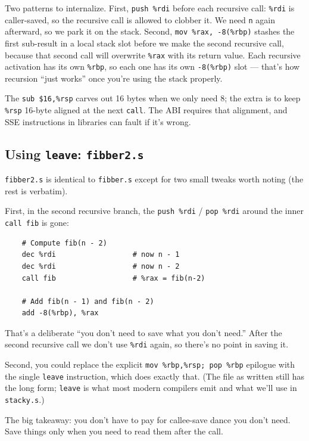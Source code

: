 \documentclass[11pt]{article}
\begin{document}
Two patterns to internalize. First, \texttt{push \%rdi} before each
recursive call: \texttt{\%rdi} is caller-saved, so the recursive call
is allowed to clobber it. We need \texttt{n} again afterward, so we
park it on the stack. Second, \texttt{mov \%rax, -8(\%rbp)} stashes
the first sub-result in a local stack slot before we make the second
recursive call, because that second call will overwrite \texttt{\%rax}
with its return value. Each recursive activation has its own
\texttt{\%rbp}, so each one has its own \texttt{-8(\%rbp)} slot ---
that's how recursion ``just works'' once you're using the stack
properly.

The \texttt{sub \$16,\%rsp} carves out 16 bytes when we only need 8;
the extra is to keep \texttt{\%rsp} 16-byte aligned at the next
\texttt{call}. The ABI requires that alignment, and SSE instructions
in libraries can fault if it's wrong.

\subsection*{Using \texttt{leave}: \texttt{fibber2.s}}

\texttt{fibber2.s} is identical to \texttt{fibber.s} except for two
small tweaks worth noting (the rest is verbatim).

First, in the second recursive branch, the \texttt{push \%rdi} /
\texttt{pop \%rdi} around the inner \texttt{call fib} is gone:

\begin{lstlisting}
    # Compute fib(n - 2)
    dec %rdi                  # now n - 1
    dec %rdi                  # now n - 2
    call fib                  # %rax = fib(n-2)

    # Add fib(n - 1) and fib(n - 2)
    add -8(%rbp), %rax
\end{lstlisting}

That's a deliberate ``you don't need to save what you don't need.''
After the second recursive call we don't use \texttt{\%rdi} again, so
there's no point in saving it.

Second, you could replace the explicit
\texttt{mov \%rbp,\%rsp; pop \%rbp} epilogue with the single
\texttt{leave} instruction, which does exactly that. (The file as
written still has the long form; \texttt{leave} is what most modern
compilers emit and what we'll use in \texttt{stacky.s}.)

The big takeaway: you don't have to pay for callee-save dance you
don't need. Save things only when you need to read them after the
call.
\end{document}
